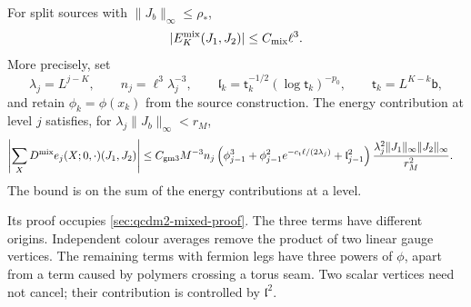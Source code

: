 \documentclass[11pt,letterpaper,reqno]{amsart}
\makeatletter
\theoremstyle{definition}
\newcommand{\ms@minorstart}{%
  \pushQED{\qed}\renewcommand{\qedsymbol}{$\blacksquare$}}
\newenvironment{proposition}[1][]{\ms@minorstart\ms@proposition[#1]}
  {\popQED\endms@proposition}
\theoremstyle{remark}
\makeatother
\begin{document}
\begin{proposition}[Mixed vacuum energy]\label{C-415-5}
For split sources with $\|J_b\|_\infty\le\rho_*$,
\begin{equation}\label{eq:qcdm2-mixed-energy}
 |E_K^{\rm mix}(J_1,J_2)|\le C_{\rm mix}\ell^3.
\end{equation}
More precisely, set
\[
 \lambda_j=L^{j-K},\qquad n_j=\ell^3\lambda_j^{-3},\qquad
 \mathfrak l_k=\mathsf t_k^{-1/2}(\log\mathsf t_k)^{-p_0},
 \qquad \mathsf t_k=L^{K-k}\mathsf b,
\]
and retain $\phi_k=\phi(x_k)$ from the source construction.
The energy contribution at level $j$ satisfies, for
$\lambda_j\|J_b\|_\infty<r_M$,
\begin{align}
 \left|\sum_XD^{\rm mix}e_j(X;0,\cdot)(J_1,J_2)\right|
 &\le C_{\rm gm3}M^{-3}n_j
 \left(\phi_{j-1}^3
       +\phi_{j-1}^2e^{-c_{\rm t}\ell/(2\lambda_j)}
       +\mathfrak l_{j-1}^2\right)
 \frac{\lambda_j^2\|J_1\|_\infty\|J_2\|_\infty}{r_M^2}.
 \label{eq:qcdm2-mixed-step}
\end{align}
The bound is on the sum of the energy contributions at a level.
\end{proposition}

Its proof occupies \cref{sec:qcdm2-mixed-proof}.  The three terms
have different origins.  Independent colour averages remove the
product of two linear gauge vertices.  The remaining terms with
fermion legs have three powers of $\phi$, apart from a term caused
by polymers crossing a torus seam.  Two scalar vertices need not
cancel; their contribution is controlled by $\mathfrak l^2$.
\end{document}
